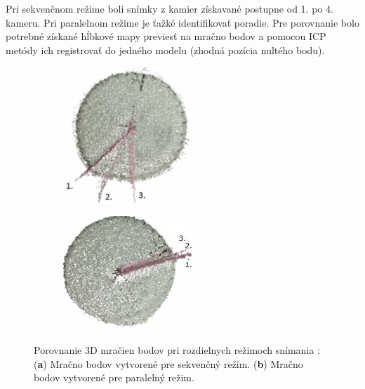 Pri sekvenčnom režime boli snímky z kamier získavané postupne od 1. po 4. kameru. Pri paralelnom režime je ťažké identifikovať poradie. Pre porovnanie bolo potrebné získané hĺbkové mapy previesť na mračno bodov a pomocou ICP metódy ich registrovať do jedného modelu (zhodná pozícia nultého bodu). 

\begin{figure}[h]
	\centering
	\begin{subfigure}[b]{0.44\textwidth}
		\centering
		\includegraphics[width=5cm]{figures/dynamic_result_seq.png}
		\caption{}
		\label{fig:dynamic:a}
	\end{subfigure}
	\hskip 8pt 
	\begin{subfigure}[b]{0.44\textwidth}
		\centering
		\includegraphics[width=5cm]{figures/dynamic_result_par.png}
		\caption{}
		\label{fig:dynamic:b}
	\end{subfigure}
	\caption{Porovnanie 3D mračien bodov pri rozdielnych režimoch snímania \cite{janisova}: (\textbf{a}) Mračno bodov vytvorené pre sekvenčný režim. (\textbf{b}) Mračno bodov vytvorené pre paralelný režim.}
	\label{fig:dynamic}
\end{figure}



